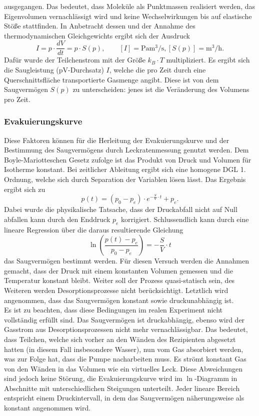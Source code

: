 ausgegangen. Das bedeutet, dass Moleküle als Punktmassen realisiert werden, 
das Eigenvolumen vernachlässigt wird und keine Wechselwirkungen bis auf elastische 
Stöße stattfinden. In Anbetracht dessen und der Annahme des thermodynamischen 
Gleichgewichts ergibt sich der Ausdruck
\begin{equation}
    \label{eqn:2}
    I = p \cdot \frac{dV}{dt} = p \cdot S(p), \qquad [I] = \si{\pascal\meter\cubed\per\second}, [S(p)] = \si{\meter\cubed\per\hour}.
\end{equation}
Dafür wurde der Teilchenstrom mit der Größe $k_B \cdot T$ multipliziert. Es 
ergibt sich die Saugleistung (pV-Durchsatz) $I$, welche die pro Zeit durch eine
Querschnittsfläche transportierte Gasmenge angibt. \cite{glossar} Diese ist von
dem Saugvermögen $S(p)$ zu unterscheiden: jenes ist die Veränderung des Volumens 
pro Zeit.

\subsubsection{Evakuierungskurve}
Diese Faktoren können für die Herleitung der Evakuierungskurve und der Bestimmung 
des Saugvermögens durch Leckratenmessung genutzt werden. Dem Boyle-Mariotteschen 
Gesetz zufolge ist das Produkt von Druck und Volumen für Isotherme konstant. 
Bei zeitlicher Ableitung ergibt sich eine homogene DGL 1. Ordnung, welche sich 
durch Separation der Variablen lösen lässt. Das Ergebnis ergibt sich zu 
\begin{equation}
    \label{eqn:3}
    p(t) = (p_0 - p_e) \cdot e^{- \frac{S}{V} \cdot t} + p_e.
\end{equation}
Dabei wurde die physikalische Tatsache, dass der Druckabfall nicht auf Null 
abfallen kann durch den Enddruck $p_e$ korrigiert. Schlussendlich kann durch 
eine lineare Regression über die daraus resultierende Gleichung
\begin{equation}
    \label{eqn:4}
    \ln\left(\frac{p(t) - p_e}{p_0 - p_e}\right) =  - \frac{S}{V} \cdot t
\end{equation}
das Saugvermögen bestimmt werden. Für diesen Versuch werden die Annahmen gemacht,
dass der Druck mit einem konstanten Volumen gemessen und die Temperatur konstant 
bleibt. Weiter soll der Prozess quasi-statisch sein, des Weiteren werden 
Desorptionsprozesse nicht berücksichtigt. Letztlich wird angenommen, dass das 
Saugvermögen konstant sowie druckunabhängig ist. 
\\
Es ist zu beachten, dass diese 
Bedingungen im realen Experiment nicht vollständig erfüllt sind. Das Saugvermögen 
ist druckabhängig, ebenso wird der Gasstrom aus Desorptionsprozessen nicht mehr 
vernachlässigbar. Das bedeutet, dass Teilchen, welche sich vorher an den Wänden 
des Rezipienten abgesetzt hatten (in diesem Fall insbesondere Wasser), nun vom
Gas absorbiert werden, was zur Folge hat, dass die Pumpe nacharbeiten muss. Es
strömt konstant Gas von den Wänden in das Volumen wie ein virtuelles Leck. Diese
Abweichungen sind jedoch keine Störung, die Evakuierungskurve wird im 
$\ln$-Diagramm in Abschnitte mit unterschiedlichen Steigungen unterteilt. Jeder
lineare Bereich entspricht einem Druckintervall, in dem das Saugvermögen 
näherungsweise als konstant angenommen wird.


